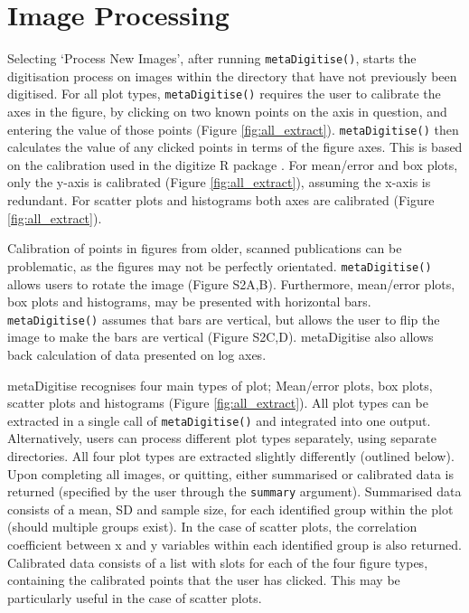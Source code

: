 \documentclass[12pt]{article}
\newcommand{\code}[1]{\texttt{#1}}
\newcommand{\fct}[1]{\texttt{#1()}}
\newcommand{\pkg}[1]{{\fontseries{b}\selectfont #1}}
\begin{document}


\section{Image Processing}
 Selecting `Process New Images', after running \fct{metaDigitise}, starts the digitisation process on images within the directory that have not previously been digitised. For all plot types, \fct{metaDigitise} requires the user to calibrate the axes in the figure, by clicking on two known points on the axis in question, and entering the value of those points (Figure \ref{fig:all_extract}). \fct{metaDigitise} then calculates the value of any clicked points in terms of the figure axes. This is based on the calibration used in the \pkg{digitize} R package \citep{Poisot2011}. For mean/error and box plots, only the y-axis is calibrated (Figure \ref{fig:all_extract}), assuming the x-axis is redundant. For scatter plots and histograms both axes are calibrated (Figure \ref{fig:all_extract}).

Calibration of points in figures from older, scanned publications can be problematic, as the figures may not be perfectly orientated. \fct{metaDigitise} allows users to rotate the image (Figure S2A,B). Furthermore, mean/error plots, box plots and histograms, may be presented with horizontal bars. \fct{metaDigitise} assumes that bars are vertical, but allows the user to flip the image to make the bars are vertical (Figure S2C,D). \pkg{metaDigitise} also allows back calculation of data presented on log axes.

\pkg{metaDigitise} recognises four main types of plot; Mean/error plots, box plots, scatter plots and histograms (Figure \ref{fig:all_extract}). All plot types can be extracted in a single call of \fct{metaDigitise} and integrated into one output. Alternatively, users can process different plot types separately, using separate directories. All four plot types are extracted slightly differently (outlined below). Upon completing all images, or quitting, either summarised or calibrated data is returned (specified by the user through the \code{summary} argument). Summarised data consists of a mean, SD and sample size, for each identified group within the plot (should multiple groups exist). In the case of scatter plots, the correlation coefficient between x and y variables within each identified group is also returned. Calibrated data consists of a list with slots for each of the four figure types, containing the calibrated points that the user has clicked. This may be particularly useful in the case of scatter plots. 
\end{document}
